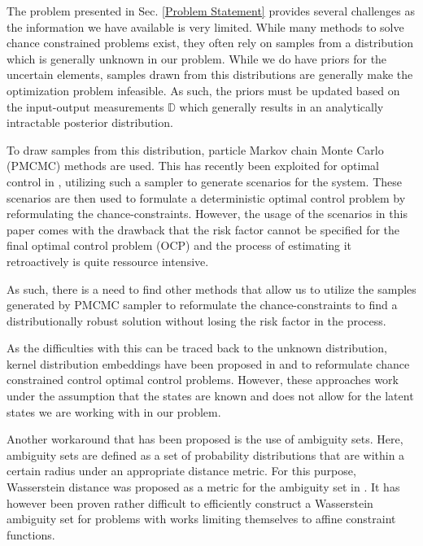 
The problem presented in Sec. \ref{Problem Statement} provides several challenges as the information we have available is very limited. While many methods to solve chance constrained problems exist, they often rely on samples from a distribution which is generally unknown in our problem. While we do have priors for the uncertain elements, samples drawn from this distributions are generally make the optimization problem infeasible. As such, the priors must be updated based on the input-output measurements $\mathbb{D}$ which generally results in an analytically intractable posterior distribution.

To draw samples from this distribution, particle Markov chain Monte Carlo (PMCMC) methods \cite{Andrieu_10} are used. This has recently been exploited for optimal control in \cite{Robert_24} , utilizing such a sampler to generate scenarios for the system. These scenarios are then used to formulate a deterministic optimal control problem by reformulating the chance-constraints. However, the usage of the scenarios in this paper comes with the drawback that the risk factor cannot be specified for the final optimal control problem (OCP) and the process of estimating it retroactively is quite ressource intensive.

As such, there is a need to find other methods that allow us to utilize the samples generated by PMCMC sampler to reformulate the chance-constraints to find a distributionally robust solution without losing the risk factor in the process. 

As the difficulties with this can be traced back to the unknown distribution, kernel distribution embeddings have been proposed in \cite{Adam_21} and \cite{Adam_22} to reformulate chance constrained control optimal control problems. However, these approaches work under the assumption that the states are known and does not allow for the latent states we are working with in our problem.

Another workaround that has been proposed is the use of ambiguity sets. Here, ambiguity sets are defined as a set of probability distributions that are within a certain radius under an appropriate distance metric. For this purpose, Wasserstein distance was proposed as a metric for the ambiguity set in \cite{Hota_19}. It has however been proven rather difficult to efficiently construct a Wasserstein ambiguity set for problems with works limiting themselves to affine constraint functions. 

